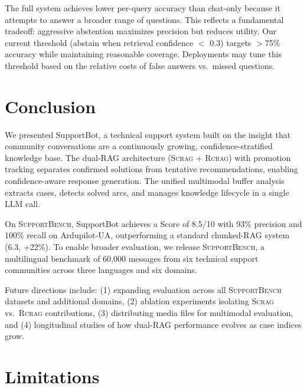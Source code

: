 \documentclass[11pt]{article}
\newcommand{\scrag}{\textsc{Scrag}}
\newcommand{\rcrag}{\textsc{Rcrag}}
\newcommand{\supportbench}{\textsc{SupportBench}}
\begin{document}
The full system achieves lower per-query accuracy than chat-only because it attempts to answer a broader range of questions. This reflects a fundamental tradeoff: aggressive abstention maximizes precision but reduces utility. Our current threshold (abstain when retrieval confidence $<$ 0.3) targets $>$75\% accuracy while maintaining reasonable coverage. Deployments may tune this threshold based on the relative costs of false answers vs.\ missed questions.

\section{Conclusion}

We presented SupportBot, a technical support system built on the insight that community conversations are a continuously growing, confidence-stratified knowledge base. The dual-RAG architecture (\scrag{} + \rcrag{}) with promotion tracking separates confirmed solutions from tentative recommendations, enabling confidence-aware response generation. The unified multimodal buffer analysis extracts cases, detects solved arcs, and manages knowledge lifecycle in a single LLM call.

On \supportbench{}, SupportBot achieves a Score of 8.5/10 with 93\% precision and 100\% recall on Ardupilot-UA, outperforming a standard chunked-RAG system (6.3, +22\%). To enable broader evaluation, we release \supportbench{}, a multilingual benchmark of 60{,}000 messages from six technical support communities across three languages and six domains.

Future directions include: (1) expanding evaluation across all \supportbench{} datasets and additional domains, (2) ablation experiments isolating \scrag{} vs.\ \rcrag{} contributions, (3) distributing media files for multimodal evaluation, and (4) longitudinal studies of how dual-RAG performance evolves as case indices grow.

\section*{Limitations}
\end{document}
